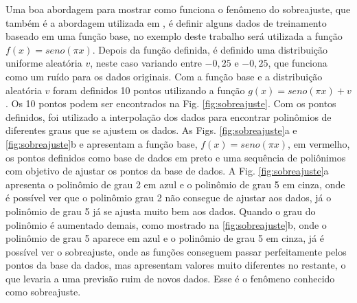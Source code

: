 Uma boa abordagem para mostrar como funciona o fenômeno do sobreajuste, que também é a abordagem utilizada em \cite{lawrence1997using, carlospedroviannalordelo2018}, é definir alguns dados de treinamento baseado em uma função base, no exemplo deste trabalho será utilizada a função $f(x)=seno(\pi x)$. Depois da função definida, é definido uma distribuição uniforme aleatória $v$, neste caso variando entre $-0,25$ e $-0,25$, que funciona como um ruído para os dados originais. Com a função base e a distribuição aleatória $v$ foram definidos 10 pontos utilizando a função $g(x)=seno(\pi x) + v$. Os 10 pontos podem ser encontrados na Fig. \ref{fig:sobreajuste}. Com os pontos definidos, foi utilizado a interpolação dos dados para encontrar polinômios de diferentes graus que se ajustem os dados. As Figs. \ref{fig:sobreajuste}a e \ref{fig:sobreajuste}b e apresentam a função base, $f(x)=seno(\pi x)$, em vermelho, os pontos definidos como base de dados em preto e uma sequência de poliônimos com objetivo de ajustar os pontos da base de dados. A Fig. \ref{fig:sobreajuste}a apresenta o polinômio de grau 2 em azul e o polinômio de grau 5 em cinza, onde é possível ver que o polinômio grau 2 não consegue de ajustar aos dados, já o polinômio de grau 5 já se ajusta muito bem aos dados. Quando o grau do polinômio é aumentado demais, como mostrado na \ref{fig:sobreajuste}b, onde o polinômio de grau 5 aparece em azul e o polinômio de grau 5 em cinza, já é possível ver o sobreajuste, onde as funções conseguem passar perfeitamente pelos pontos da base da dados, mas apresentam valores muito diferentes no restante, o que levaria a uma previsão ruim de novos dados. Esse é o fenômeno conhecido como sobreajuste.

